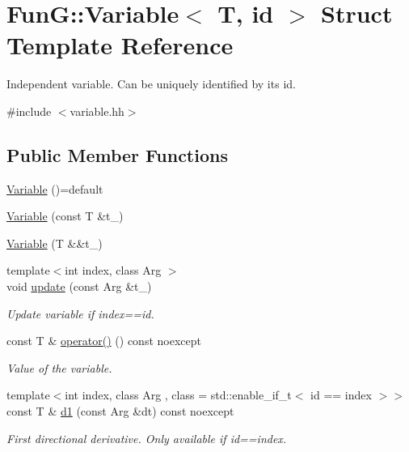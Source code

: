 \hypertarget{structFunG_1_1Variable}{}\section{FunG\+:\+:Variable$<$ T, id $>$ Struct Template Reference}
\label{structFunG_1_1Variable}


Independent variable. Can be uniquely identified by its id.  




{\ttfamily \#include $<$variable.\+hh$>$}

\subsection*{Public Member Functions}
\begin{DoxyCompactItemize}
\item 
\hyperlink{structFunG_1_1Variable_a20d207e651ee9e93c86dfa4ea1053f56}{Variable} ()=default
\item 
\hyperlink{structFunG_1_1Variable_a10238450dac2ec4c98400b106543ff8f}{Variable} (const T \&t\+\_\+)
\item 
\hyperlink{structFunG_1_1Variable_a9abfae2c2ab06cbe2556600bae7c7ccb}{Variable} (T \&\&t\+\_\+)
\item 
{\footnotesize template$<$int index, class Arg $>$ }\\void \hyperlink{structFunG_1_1Variable_a50f4d34586aa6a89df604503e0a3c2a9}{update} (const Arg \&t\+\_\+)
\begin{DoxyCompactList}\small\item\em Update variable if index==id. \end{DoxyCompactList}\item 
const T \& \hyperlink{structFunG_1_1Variable_a84333150762e0e5472ab508ca3f26e4f}{operator()} () const noexcept
\begin{DoxyCompactList}\small\item\em Value of the variable. \end{DoxyCompactList}\item 
{\footnotesize template$<$int index, class Arg , class  = std\+::enable\+\_\+if\+\_\+t$<$ id == index $>$$>$ }\\const T \& \hyperlink{structFunG_1_1Variable_a9384160b4015767ffe6a058583fef10a}{d1} (const Arg \&dt) const noexcept
\begin{DoxyCompactList}\small\item\em First directional derivative. Only available if id==index. \end{DoxyCompactList}\end{DoxyCompactItemize}


